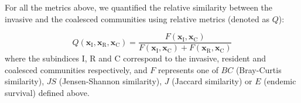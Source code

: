 \documentclass[a4paper,10pt]{article}
\begin{document}

For all the metrics above, we quantified the relative similarity between the invasive
and the coalesced communities using relative metrics (denoted as $Q$):

\begin{equation}
Q \left( \mathbf{x}_\mathrm{I},
\mathbf{x}_\mathrm{R},
\mathbf{x}_\mathrm{C} \right) = 
\frac{F \left( \mathbf{x}_\mathrm{I},\mathbf{x}_\mathrm{C}\right)}
{F \left( \mathbf{x}_\mathrm{I},\mathbf{x}_\mathrm{C}\right)
+
F \left( \mathbf{x}_\mathrm{R},\mathbf{x}_\mathrm{C}\right)}
\label{eq:q}
\end{equation}
%
where the subindices I, R and C correspond to the invasive, resident and coalesced
communities respectively, and $F$ represents one of $BC$ (Bray-Curtis similarity), $JS$
(Jensen-Shannon similarity), $J$ (Jaccard similarity) or $E$ (endemic survival) defined above.
\end{document}
